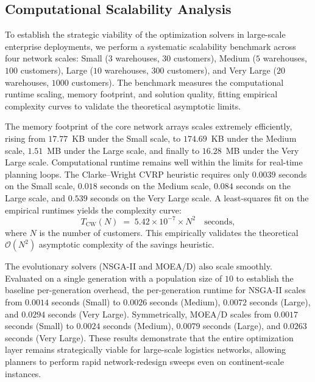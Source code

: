 \documentclass[review,preprint,authoryear,12pt]{elsarticle}
\begin{document}
\begin{table}[H]
\centering
\caption{Trip-relaxation sensitivity: continuous-flow vs.\
discrete-trip-ceiling formulation, mean normalised hypervolume across
$5$ seeds with a joint ideal-nadir reference.}
\label{tab:trip_relaxation}

\end{table}

\subsection{Computational Scalability Analysis}
\label{sec:experiments:scalability}

To establish the strategic viability of the optimization solvers in large-scale enterprise deployments, we perform a systematic scalability benchmark across four network scales: Small ($3$ warehouses, $30$ customers), Medium ($5$ warehouses, $100$ customers), Large ($10$ warehouses, $300$ customers), and Very Large ($20$ warehouses, $1000$ customers). The benchmark measures the computational runtime scaling, memory footprint, and solution quality, fitting empirical complexity curves to validate the theoretical asymptotic limits.

The memory footprint of the core network arrays scales extremely efficiently, rising from $17.77$~KB under the Small scale, to $174.69$~KB under the Medium scale, $1.51$~MB under the Large scale, and finally to $16.28$~MB under the Very Large scale. Computational runtime remains well within the limits for real-time planning loops. The Clarke--Wright CVRP heuristic requires only $0.0039$ seconds on the Small scale, $0.018$ seconds on the Medium scale, $0.084$ seconds on the Large scale, and $0.539$ seconds on the Very Large scale. A least-squares fit on the empirical runtimes yields the complexity curve:
\begin{equation}
T_{\mathrm{CW}}(N) \;=\; 5.42 \times 10^{-7} \times N^{2} \quad \text{seconds},
\label{eq:complexity-fit}
\end{equation}
where $N$ is the number of customers. This empirically validates the theoretical $\mathcal{O}(N^{2})$ asymptotic complexity of the savings heuristic.

The evolutionary solvers (NSGA-II and MOEA/D) also scale smoothly. Evaluated on a single generation with a population size of $10$ to establish the baseline per-generation overhead, the per-generation runtime for NSGA-II scales from $0.0014$ seconds (Small) to $0.0026$ seconds (Medium), $0.0072$ seconds (Large), and $0.0294$ seconds (Very Large). Symmetrically, MOEA/D scales from $0.0017$ seconds (Small) to $0.0024$ seconds (Medium), $0.0079$ seconds (Large), and $0.0263$ seconds (Very Large). These results demonstrate that the entire optimization layer remains strategically viable for large-scale logistics networks, allowing planners to perform rapid network-redesign sweeps even on continent-scale instances.
\end{document}
